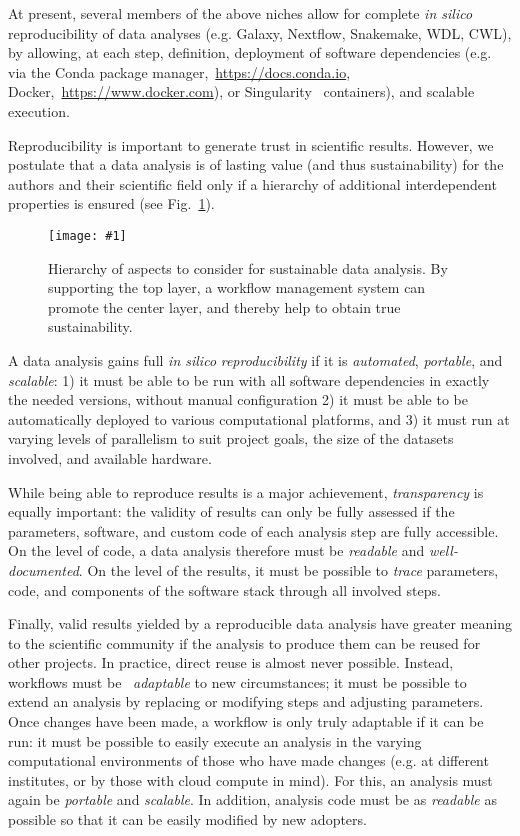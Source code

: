 \documentclass[parskip=half]{scrartcl}
\newcommand{\image}[1]{\centering\texttt{[image: \#1]}}
\let\plainurl\url
\renewcommand{\url}[1]{\protect\plainurl{#1}}
\begin{document}
At present, several members of the above niches allow for complete \emph{in silico} reproducibility of data analyses (e.g. Galaxy, Nextflow, Snakemake, WDL, CWL), by allowing, at each step, definition, deployment of software dependencies (e.g. via the Conda package manager,~\url{https://docs.conda.io}, Docker,~\url{https://www.docker.com}), or Singularity~\parencite{kurtzer_singularity_2017} containers), and scalable execution.

Reproducibility is important to generate trust in scientific results.
However, we postulate that a data analysis is of lasting value (and thus sustainability) for the authors and their scientific field only if a hierarchy of additional interdependent properties is ensured (see Fig.~\ref{fig:sustainability}).

\begin{figure}
	\image{sustainability-in-wms.pdf}
	\caption{
		Hierarchy of aspects to consider for sustainable data analysis.
		By supporting the top layer, a workflow management system can promote the center layer, and thereby help to obtain true sustainability.
	}\label{fig:sustainability}
\end{figure}

A data analysis gains full \emph{in silico} \emph{reproducibility} if it is \emph{automated}, \emph{portable}, and \emph{scalable}: 1) it must be able to be run with all software dependencies in exactly the needed versions, without manual configuration 2) it must be able to be automatically deployed to various computational platforms, and 3) it must run at varying levels of parallelism to suit project goals, the size of the datasets involved, and available hardware.

While being able to reproduce results is a major achievement, \emph{transparency} is equally important: the validity of results can only be fully assessed if the parameters, software, and custom code of each analysis step are fully accessible.
On the level of code, a data analysis therefore must be \emph{readable} and \emph{well-documented}.
On the level of the results, it must be possible to \emph{trace} parameters, code, and components of the software stack through all involved steps.

Finally, valid results yielded by a reproducible data analysis have greater meaning to the scientific community if the analysis to produce them can be reused for other projects.
In practice, direct reuse is almost never possible. Instead, workflows must be ~\emph{adaptable} to new circumstances; it must be possible to extend an analysis by replacing or modifying steps and adjusting parameters.
Once changes have been made, a workflow is only truly adaptable if it can be run: it must be possible to easily execute an analysis in the varying computational environments of those who have made changes (e.g. at different institutes, or by those with cloud compute in mind). For this, an analysis must again be \emph{portable} and \emph{scalable}.
In addition, analysis code must be as \emph{readable} as possible so that it can be easily modified by new adopters.
\end{document}
